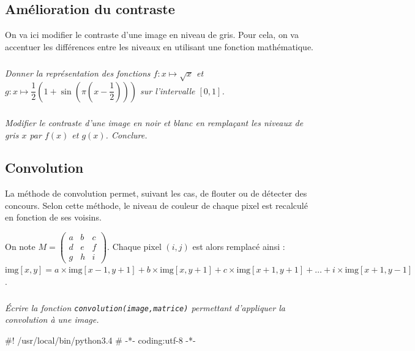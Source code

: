 \documentclass[10pt,fleqn]{article} %
\begin{document}
\begin{multicols}{2}
\subsection*{Amélioration du contraste}
On va ici modifier le contraste d'une image en niveau de gris. 
Pour cela, on va accentuer les différences entre les niveaux en utilisant une fonction mathématique. 

\subparagraph{}\textit{Donner la représentation des fonctions $f:x \mapsto \sqrt{x}$ et $g:x\mapsto \dfrac{1}{2}\left(1+\sin\left(\pi\left(x-\dfrac{1}{2}\right)\right)\right)$ sur l'intervalle $[0,1]$.}

\subparagraph{}\textit{Modifier le contraste d'une image en noir et blanc en remplaçant les niveaux de gris $x$ par $f(x)$ et $g(x)$. Conclure.}

\subsection*{Convolution}
La méthode de convolution permet, suivant les cas, de flouter ou de détecter des concours. 
Selon cette méthode, le niveau de couleur de chaque pixel est recalculé en fonction de ses voisins. 

\begin{center}
\end{center}

On note $M=\begin{pmatrix} a & b & c \\ d & e & f \\ g & h & i \end{pmatrix}$. Chaque pixel $(i,j)$ est alors remplacé ainsi : $\text{img}[x, y] = a \times \text{img}[x-1, y+1] + b \times \text{img}[x, y+1]+ c \times \text{img}[x+1, y+1] + \ldots + i \times \text{img}[x+1, y-1]$.

\subparagraph{}\textit{Écrire la fonction \texttt{convolution(image,matrice)} permettant d'appliquer la convolution à une image.}


\ifprof
\begin{corrige}
\begin{python}
#! /usr/local/bin/python3.4
# -*- coding:utf-8 -*-
    

\end{python}
\end{corrige}
\end{multicols}
\end{document}
